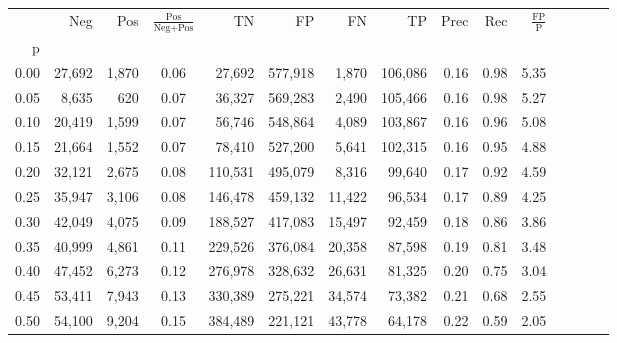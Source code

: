 \begin{tabular}{rrrcrrrrrrrrrrr}
\toprule
{} &     Neg &    Pos & $\frac{\text{Pos}}{\text{Neg}+\text{Pos}}$ &       TN &       FP &       FN &       TP &  Prec &   Rec & $\frac{\text{FP}}{\text{P}}$ \\
p    &         &        &                                            &          &          &          &          &       &       &                              \\
\midrule
0.00 &  27,692 &  1,870 &                                       0.06 &   27,692 &  577,918 &    1,870 &  106,086 &  0.16 &  0.98 &                         5.35 \\
0.05 &   8,635 &    620 &                                       0.07 &   36,327 &  569,283 &    2,490 &  105,466 &  0.16 &  0.98 &                         5.27 \\
0.10 &  20,419 &  1,599 &                                       0.07 &   56,746 &  548,864 &    4,089 &  103,867 &  0.16 &  0.96 &                         5.08 \\
0.15 &  21,664 &  1,552 &                                       0.07 &   78,410 &  527,200 &    5,641 &  102,315 &  0.16 &  0.95 &                         4.88 \\
0.20 &  32,121 &  2,675 &                                       0.08 &  110,531 &  495,079 &    8,316 &   99,640 &  0.17 &  0.92 &                         4.59 \\
0.25 &  35,947 &  3,106 &                                       0.08 &  146,478 &  459,132 &   11,422 &   96,534 &  0.17 &  0.89 &                         4.25 \\
0.30 &  42,049 &  4,075 &                                       0.09 &  188,527 &  417,083 &   15,497 &   92,459 &  0.18 &  0.86 &                         3.86 \\
0.35 &  40,999 &  4,861 &                                       0.11 &  229,526 &  376,084 &   20,358 &   87,598 &  0.19 &  0.81 &                         3.48 \\
0.40 &  47,452 &  6,273 &                                       0.12 &  276,978 &  328,632 &   26,631 &   81,325 &  0.20 &  0.75 &                         3.04 \\
0.45 &  53,411 &  7,943 &                                       0.13 &  330,389 &  275,221 &   34,574 &   73,382 &  0.21 &  0.68 &                         2.55 \\
0.50 &  54,100 &  9,204 &                                       0.15 &  384,489 &  221,121 &   43,778 &   64,178 &  0.22 &  0.59 &                         2.05 \\

\end{tabular}
